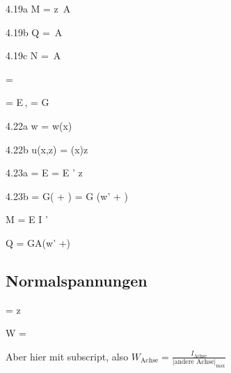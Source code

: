 \documentclass[11pt]{article}
\newcommand{\1}{ {\mathds{1}} }
\newcommand{\abs}[1]{\lvert#1\rvert}
\newcommand{\td}{\,\text{d}}
\begin{document}
\begin{multicols*}{3}
		\begin{formel}{4.19a}
			M = \int z \sigma \td A
		\end{formel}

		\begin{formel}{4.19b}
			Q = \int \tau \td A
		\end{formel}

		\begin{formel}{4.19c}
			N = \int \sigma \td A
		\end{formel}

		\begin{formel}{4.20}
			\epsilon = 
		\end{formel}

		\begin{formel}{4.21}
			\sigma= E\,\epsilon, \quad \tau = G\,\gamma
		\end{formel}

		\begin{formel}{4.22a}
			w = w(x)
		\end{formel}

		\begin{formel}{4.22b}
			u(x,z) = \psi(x)z
		\end{formel}

		\begin{formel}{4.23a}
			\sigma = E = E \psi' z
		\end{formel}

		\begin{formel}{4.23b}
			\tau = G\left(  +  \right) = G (w' + \psi)
		\end{formel}

		\begin{formel}{4.24}
			M = E I \psi'
		\end{formel}

		\begin{formel}{4.25}
			Q = \varkappa GA(w' +\psi)
		\end{formel}

		\subsection{Normalspannungen}

		\begin{formel}{4.26}
			\sigma
			=
			z
		\end{formel}

		\begin{formel}{4.27}
			W
			=
			\frac{I}{\abs{z}_{\text{max}}}
		\end{formel}
		Aber hier mit subscript, also $\displaystyle W_{\text{Achse}} = \frac{I_{\text{Achse}}}{\abs{\text{andere Achse}}_{\text{max}}}$


\end{multicols*}
\end{document}
